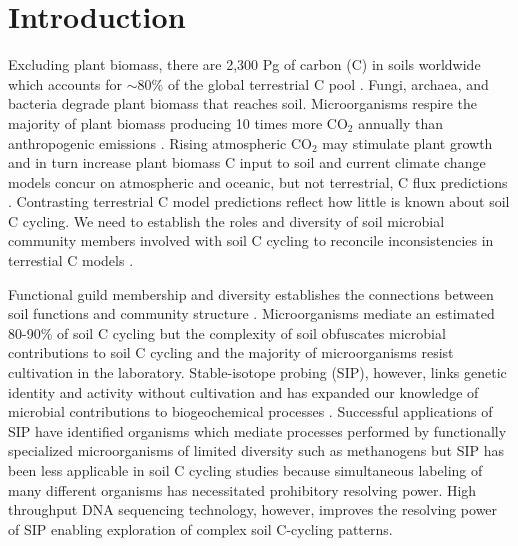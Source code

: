 \section{Introduction}
Excluding plant biomass, there are 2,300 Pg of carbon (C) in soils
worldwide which accounts for $\sim$80\% of the global terrestrial C pool
\citep{Amundson_2001,BATJES_1996}. Fungi, archaea, and bacteria degrade plant
biomass that reaches soil. Microorganisms respire the majority of plant biomass
producing 10 times more CO$_{2}$ annually than anthropogenic emissions
\citep{chapin2002principles}. Rising atmospheric CO$_{2}$ may stimulate
plant growth and in turn increase plant biomass C input to soil
\citep{Groenigen_2006} and current climate change models concur on atmospheric
and oceanic, but not terrestrial, C flux predictions
\citep{Friedlingstein_2006}. Contrasting terrestrial C model predictions
reflect how little is known about soil C cycling. We need to establish the
roles and diversity of soil microbial community members involved with soil
C cycling to reconcile inconsistencies in terrestial C models
\citep{Neff_2001,McGuire2010a}.

Functional guild membership and diversity establishes the connections between
soil functions and community structure \citep{O_Donnell_2002}. Microorganisms
mediate an estimated 80-90\% of soil C cycling
\citep{ColemanCrossley_1996,Nannipieri_2003} but the complexity of soil
obfuscates microbial contributions to soil C cycling and the majority of
microorganisms resist cultivation in the laboratory. Stable-isotope probing
(SIP), however, links genetic identity and activity without cultivation and has
expanded our knowledge of microbial contributions to biogeochemical processes
\citep{Chen_Murrell_2010}. Successful applications of SIP have identified
organisms which mediate processes performed by functionally specialized
microorganisms of limited diversity such as methanogens \citep{Lu_2005} but SIP
has been less applicable in soil C cycling studies because simultaneous
labeling of many different organisms has necessitated prohibitory resolving
power. High throughput DNA sequencing technology, however, improves the
resolving power of SIP enabling exploration of complex soil C-cycling patterns.

